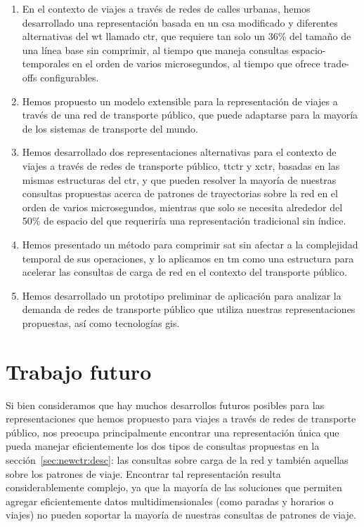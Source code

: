     \begin{enumerate}
        \item En el contexto de viajes a trav\'es de redes de calles urbanas, hemos desarrollado una representaci\'on basada en un \gls{csa} modificado y diferentes alternativas del \gls{wt} llamado \gls{ctr}, que requiere tan solo un 36\% del tama\~no de una l\'inea base sin comprimir, al tiempo que maneja consultas espacio-temporales en el orden de varios microsegundos, al tiempo que ofrece trade-offs configurables.
        
        \item Hemos propuesto un modelo extensible para la representaci\'on de viajes a trav\'es de una red de transporte p\'ublico, que puede adaptarse para la mayor\'ia de los sistemas de transporte del mundo.
        
        \item Hemos desarrollado dos representaciones alternativas para el contexto de viajes a trav\'es de redes de transporte p\'ublico, \gls{ttctr} y \gls{xctr}, basadas en las mismas estructuras del \gls{ctr}, y que pueden resolver la mayor\'ia de nuestras consultas propuestas acerca de patrones de trayectorias sobre la red en el orden de varios microsegundos, mientras que solo se necesita alrededor del 50\% de espacio del que requerir\'ia una representaci\'on tradicional sin \'indice.
        
        \item Hemos presentado un m\'etodo para comprimir \acrfull{sat} sin afectar a la complejidad temporal de sus operaciones, y lo aplicamos en \gls{tm} como una estructura para acelerar las consultas de carga de red en el contexto del transporte p\'ublico.
        
        \item Hemos desarrollado un prototipo preliminar de aplicaci\'on para analizar la demanda de redes de transporte p\'ublico que utiliza nuestras representaciones propuestas, as\'i como tecnolog\'ias \gls{gis}.
    \end{enumerate}


\section{Trabajo futuro}
\label{sec:appendix-spanishsummary:trabajo-futuro}
    Si bien consideramos que hay muchos desarrollos futuros posibles para las representaciones que hemos propuesto para viajes a trav\'es de redes de transporte p\'ublico, nos preocupa principalmente encontrar una representaci\'on \'unica que pueda manejar eficientemente los dos tipos de consultas propuestas en la secci\'on~\ref{sec:newctr:desc}: las consultas sobre carga de la red y tambi\'en aquellas sobre los patrones de viaje. Encontrar tal representaci\'on resulta considerablemente complejo, ya que la mayor\'ia de las soluciones que permiten agregar eficientemente datos multidimensionales (como paradas y horarios o viajes) no pueden soportar la mayor\'ia de nuestras consultas de patrones de viaje.
    
